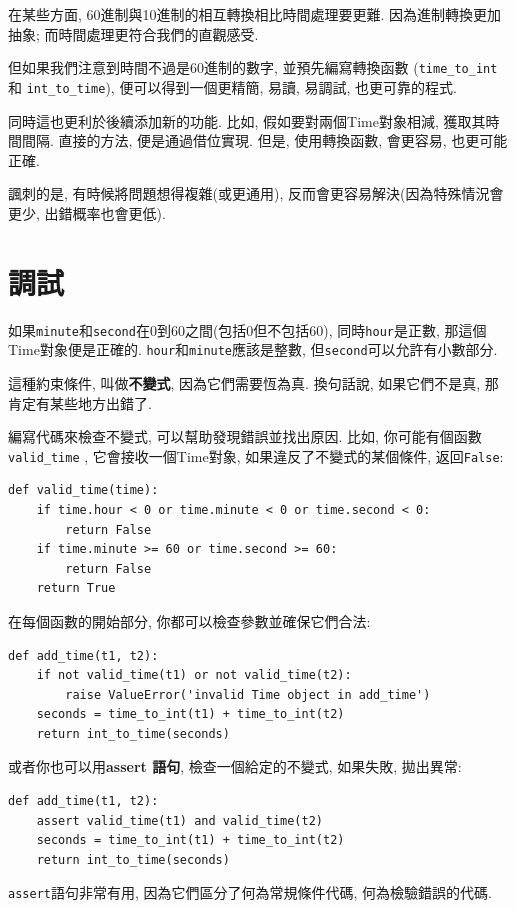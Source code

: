 \documentclass[10pt]{book}
\begin{document}
在某些方面, 60進制與10進制的相互轉換相比時間處理要更難. 
因為進制轉換更加抽象;
而時間處理更符合我們的直觀感受. 

但如果我們注意到時間不過是60進制的數字, 並預先編寫轉換函數 (\verb"time_to_int"
和 \verb"int_to_time"), 便可以得到一個更精簡, 易讀, 易調試, 也更可靠的程式. 

同時這也更利於後續添加新的功能. 
比如, 假如要對兩個Time對象相減, 獲取其時間間隔. 
直接的方法, 便是通過借位實現. 
但是, 使用轉換函數, 會更容易, 也更可能正確. 

諷刺的是, 有時候將問題想得複雜(或更通用), 反而會更容易解決(因為特殊情況會更少, 
出錯概率也會更低).


\section{調試}

如果{\tt minute}和{\tt second}在0到60之間(包括0但不包括60),
同時{\tt hour}是正數, 那這個Time對象便是正確的. 
{\tt hour}和{\tt minute}應該是整數, 但{\tt second}可以允許有小數部分. 

這種約束條件, 叫做{\bf 不變式}, 因為它們需要恆為真. 
換句話說, 如果它們不是真, 那肯定有某些地方出錯了. 

編寫代碼來檢查不變式, 可以幫助發現錯誤並找出原因. 
比如, 你可能有個函數\verb"valid_time" , 它會接收一個Time對象, 
如果違反了不變式的某個條件, 返回{\tt False}:

\begin{verbatim}
def valid_time(time):
    if time.hour < 0 or time.minute < 0 or time.second < 0:
        return False
    if time.minute >= 60 or time.second >= 60:
        return False
    return True
\end{verbatim}
%
在每個函數的開始部分, 你都可以檢查參數並確保它們合法:

\begin{verbatim}
def add_time(t1, t2):
    if not valid_time(t1) or not valid_time(t2):
        raise ValueError('invalid Time object in add_time')
    seconds = time_to_int(t1) + time_to_int(t2)
    return int_to_time(seconds)
\end{verbatim}
%
或者你也可以用{\bf assert 語句}, 檢查一個給定的不變式, 如果失敗, 拋出異常:

\begin{verbatim}
def add_time(t1, t2):
    assert valid_time(t1) and valid_time(t2)
    seconds = time_to_int(t1) + time_to_int(t2)
    return int_to_time(seconds)
\end{verbatim}
%
{\tt assert}語句非常有用, 因為它們區分了何為常規條件代碼, 何為檢驗錯誤的代碼. 
\end{document}
